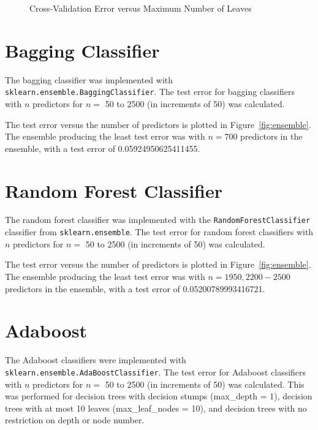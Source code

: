 \documentclass[12pt]{article}
\begin{document}
\begin{figure}[htp]
\centering
{}
\caption{Cross-Validation Error versus Maximum Number of Leaves}
\label{fig:cross_valid}
\end{figure}

\section*{Bagging Classifier}
The bagging classifier was implemented with \texttt{sklearn.ensemble.BaggingClassifier}. The test error for bagging classifiers with $n$ predictors for $n =$ 50 to 2500 (in increments of 50) was calculated.

The test error versus the number of predictors is plotted in Figure~\ref{fig:ensemble}. The ensemble producing the least test error was with $n = 700$ predictors in the ensemble, with a test error of 0.05924950625411455.

\section*{Random Forest Classifier}
The random forest classifier was implemented with the \texttt{RandomForestClassifier} classifier from \texttt{sklearn.ensemble}. The test error for random forest classifiers with $n$ predictors for $n =$ 50 to 2500 (in increments of 50) was calculated.

The test error versus the number of predictors is plotted in Figure~\ref{fig:ensemble}. The ensemble producing the least test error was with $n = 1950, 2200-2500$ predictors in the ensemble, with a test error of 0.05200789993416721.

\section*{Adaboost}
The Adaboost classifiers were implemented with \texttt{sklearn.ensemble.AdaBoostClassifier}. The test error for Adaboost classifiers with $n$ predictors for $n =$ 50 to 2500 (in increments of 50) was calculated. This was performed for decision trees with decision stumps (max\_depth = 1), decision trees with at most 10 leaves (max\_leaf\_nodes = 10), and decision trees with no restriction on depth or node number.
\end{document}
